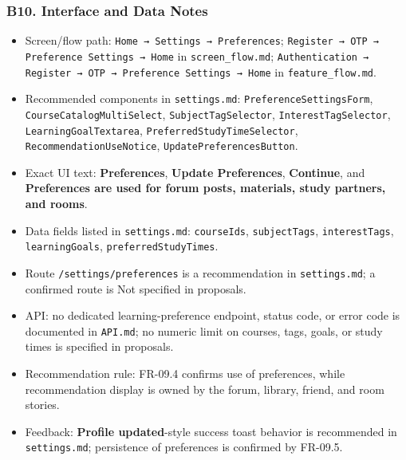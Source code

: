 \documentclass[12pt]{article}
\begin{document}
\hypertarget{sec:b10-interface-and-data-notes}{}
\subsubsection*{B10. Interface and Data Notes}
\par\medskip

\begin{itemize}
\item Screen/flow path: \texttt{Home → Settings → Preferences}; \texttt{Register → OTP → Preference Settings → Home} in \texttt{screen\_flow.md}; \texttt{Authentication → Register → OTP → Preference Settings → Home} in \texttt{feature\_flow.md}.
\item Recommended components in \texttt{settings.md}: \texttt{PreferenceSettingsForm}, \texttt{CourseCatalogMultiSelect}, \texttt{SubjectTagSelector}, \texttt{InterestTagSelector}, \texttt{LearningGoalTextarea}, \texttt{PreferredStudyTimeSelector}, \texttt{RecommendationUseNotice}, \texttt{UpdatePreferencesButton}.
\item Exact UI text: \textbf{Preferences}, \textbf{Update Preferences}, \textbf{Continue}, and \textbf{Preferences are used for forum posts, materials, study partners, and rooms}.
\item Data fields listed in \texttt{settings.md}: \texttt{courseIds}, \texttt{subjectTags}, \texttt{interestTags}, \texttt{learningGoals}, \texttt{preferredStudyTimes}.
\item Route \texttt{/settings/preferences} is a recommendation in \texttt{settings.md}; a confirmed route is Not specified in proposals.
\item API: no dedicated learning-preference endpoint, status code, or error code is documented in \texttt{API.md}; no numeric limit on courses, tags, goals, or study times is specified in proposals.
\item Recommendation rule: FR-09.4 confirms use of preferences, while recommendation display is owned by the forum, library, friend, and room stories.
\item Feedback: \textbf{Profile updated}-style success toast behavior is recommended in \texttt{settings.md}; persistence of preferences is confirmed by FR-09.5.
\end{itemize}
\par\medskip

\hypertarget{sec:b11-source-alignment-notes}{}
\end{document}
